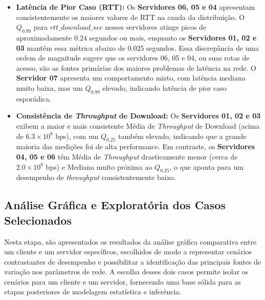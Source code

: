 \documentclass{article}
\begin{document}
\begin{itemize}
	\item \textbf{Latência de Pior Caso (RTT):} Os \textbf{Servidores 06, 05 e 04} apresentam consistentemente os maiores valores de RTT na cauda da distribuição. O $Q_{0.99}$ para $\textit{rtt\_download\_sec}$ nesses servidores atinge picos de aproximadamente $0.24$ segundos ou mais, enquanto os \textbf{Servidores 01, 02 e 03} mantêm essa métrica abaixo de $0.025$ segundos. Essa discrepância de uma ordem de magnitude sugere que os servidores 06, 05 e 04, ou suas rotas de acesso, são as fontes primárias dos maiores problemas de latência na rede. O \textbf{Servidor 07} apresenta um comportamento misto, com latência mediana muito baixa, mas um $Q_{0.99}$ elevado, indicando latência de pior caso esporádica.
	
	\item \textbf{Consistência de \textit{Throughput} de Download:} Os \textbf{Servidores 01, 02 e 03} exibem a maior e mais consistente Média de \textit{Throughput} de Download (acima de $6.3 \times 10^8$ bps), com um $Q_{0.25}$ também elevado, indicando que a grande maioria das medições foi de alta performance. Em contraste, os \textbf{Servidores 04, 05 e 06} têm Média de \textit{Throughput} drasticamente menor (cerca de $2.0 \times 10^8$ bps) e Mediana muito próxima ao $Q_{0.25}$, o que aponta para um desempenho de \textit{throughput} consistentemente baixo.
\end{itemize}

\subsection{Análise Gráfica e Exploratória dos Casos Selecionados}

Nesta etapa, são apresentados os resultados da análise gráfica comparativa entre um cliente e um servidor específicos, escolhidos de modo a representar cenários contrastantes de desempenho e possibilitar a identificação das principais fontes de variação nos parâmetros de rede.  
A escolha desses dois casos permite isolar os cenários para um cliente e um servidor, fornecendo uma base sólida para as etapas posteriores de modelagem estatística e inferência.
\end{document}

